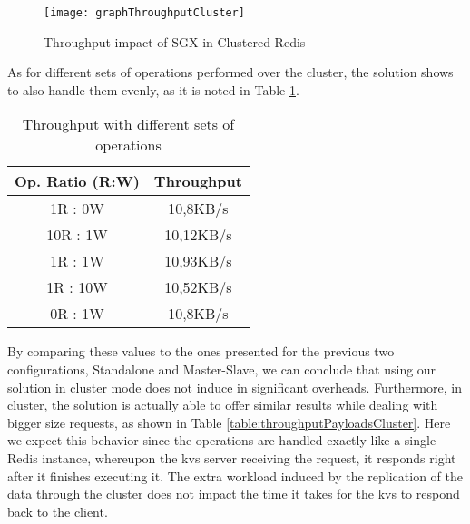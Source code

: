 \begin{figure}[htbp]
	\centering
	{\texttt{[image: graphThroughputCluster]}}
	\caption{Throughput impact of SGX in Clustered Redis}
	\label{fig:graphTroughputCluster}
\end{figure}

As for different sets of operations performed over the cluster, the solution shows to also handle them evenly, as it is noted in Table \ref{table:thptDiffRatiosClusterRedis}.

\begin{table}[ht]
	\caption{Throughput with different sets of operations} %
	\centering %
	\begin{tabular}{c c} %
		\hline\hline %
		\textbf{Op. Ratio (R:W)} & \textbf{Throughput} \\ [0.3ex] %
		\hline
		1R : 0W & 10,8KB/s\\
		\hline
		10R : 1W & 10,12KB/s \\
		\hline
		1R : 1W & 10,93KB/s\\
		\hline %
		1R : 10W & 10,52KB/s\\
		\hline 
		0R : 1W & 10,8KB/s\\ [0.3ex] %
		\hline %
	\end{tabular}
	\label{table:thptDiffRatiosClusterRedis} %
\end{table}

By comparing these values to the ones presented for the previous two configurations, Standalone and Master-Slave, we can conclude that using our solution in cluster mode does not induce in significant overheads. Furthermore, in cluster, the solution is actually able to offer similar results while dealing with bigger size requests, as shown in Table \ref{table:throughputPayloadsCluster}. Here we expect this behavior since the operations are handled exactly like a single Redis instance, whereupon the \gls{kvs} server receiving the request, it responds right after it finishes executing it. The extra workload induced by the replication of the data through the cluster does not impact the time it takes for the \gls{kvs} to respond back to the client. 

